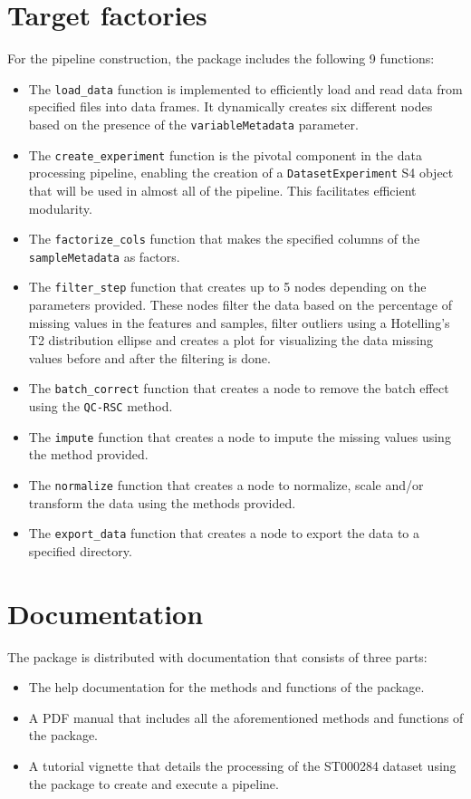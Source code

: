 \documentclass[ENG, BIB]{TFUOC}%
\begin{document}
\section{Target factories}
For the pipeline construction, the package includes the following 9 functions:
\begin{itemize}
    \item The \texttt{load\_data} function is implemented to efficiently load and read data from specified files into data frames. It dynamically creates six different nodes based on the presence of the \texttt{variableMetadata} parameter.
    \item The \texttt{create\_experiment} function is the pivotal component in the data processing pipeline, enabling the creation of a \texttt{DatasetExperiment} S4 object that will be used in almost all of the pipeline. This facilitates efficient modularity.
    \item The \texttt{factorize\_cols} function that makes the specified columns of the \texttt{sampleMetadata} as factors.
    \item The \texttt{filter\_step} function that creates up to 5 nodes depending on the parameters provided. These nodes filter the data based on the percentage of missing values in the features and samples, filter outliers using a Hotelling's T2 distribution ellipse and creates a plot for visualizing the data missing values before and after the filtering is done.
    \item The \texttt{batch\_correct} function that creates a node to remove the batch effect using the \texttt{QC-RSC} method.
    \item The \texttt{impute} function that creates a node to impute the missing values using the method provided.
    \item The \texttt{normalize} function that creates a node to normalize, scale and/or transform the data using the methods provided.
    \item The \texttt{export\_data} function that creates a node to export the data to a specified directory.
\end{itemize}

\section{Documentation}
The package is distributed with documentation that consists of three parts:
\begin{itemize}
    \item The help documentation for the methods and functions of the package.
    \item A PDF manual that includes all the aforementioned methods and functions of the package.
    \item A tutorial vignette that details the processing of the ST000284 dataset using the package to create and execute a pipeline.
\end{itemize}
\end{document}
